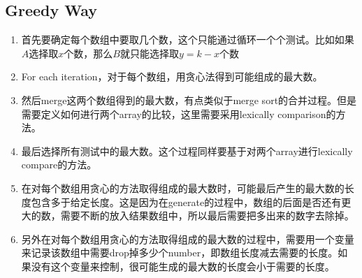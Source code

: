 \subsection{Greedy Way}
\begin{enumerate}
\item 首先要确定每个数组中要取几个数，这个只能通过循环一个个测试。比如如果$A$选择取$x$个数，那么$B$就只能选择取$y=k-x$个数
\item For each iteration，对于每个数组，用贪心法得到可能组成的最大数。
\item 然后merge这两个数组得到的最大数，有点类似于merge sort的合并过程。但是需要定义如何进行两个array的比较，这里需要采用lexically comparison的方法。
\item 最后选择所有测试中的最大数。这个过程同样要基于对两个array进行lexically compare的方法。
\item 在对每个数组用贪心的方法取得组成的最大数时，可能最后产生的最大数的长度包含多于给定长度。这是因为在generate的过程中，数组的后面是否还有更大的数，需要不断的放入结果数组中，所以最后需要把多出来的数字去除掉。 \label{step0}
\item 另外在对每个数组用贪心的方法取得组成的最大数的过程中，需要用一个变量来记录该数组中需要drop掉多少个number，即数组长度减去需要的长度。如果没有这个变量来控制，很可能生成的最大数的长度会小于需要的长度。
\end{enumerate}


